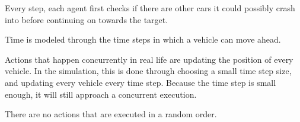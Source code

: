 Every step, each agent first checks if there are other cars it could possibly crash into before continuing on towards the target. 

Time is modeled through the time steps in which a vehicle can move ahead. 

Actions that happen concurrently in real life are updating the position of every vehicle. In the simulation, this is done through choosing a small time step size, and updating every vehicle every time step. Because the time step is small enough, it will still approach a concurrent execution.


There are no actions that are executed in a random order.
